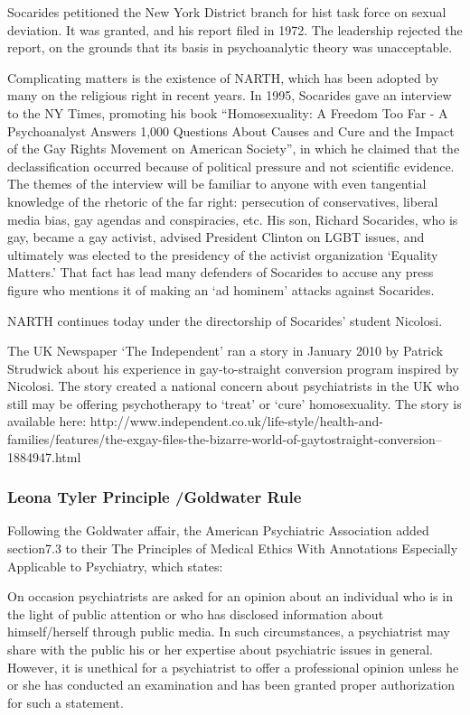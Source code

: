 Socarides petitioned the New York District branch for hist task force on sexual deviation. It was granted, and his report filed in 1972. The leadership rejected the report, on the grounds that its basis in psychoanalytic theory was unacceptable. 

Complicating matters is the existence of NARTH, which has been adopted by many on the religious right in recent years. In 1995, Socarides gave an interview to the NY Times, promoting his book ``Homosexuality: A Freedom Too Far - A Psychoanalyst Answers 1,000 Questions About Causes and Cure and the Impact of the Gay Rights Movement on American Society'', in which he claimed that the declassification occurred because of political pressure and not scientific evidence. The themes of the interview will be familiar to anyone with even tangential knowledge of the rhetoric of the far right: persecution of conservatives, liberal media bias, gay agendas and conspiracies, etc. His son, Richard Socarides, who is gay, became a gay activist, advised President Clinton on LGBT issues, and ultimately was elected to the presidency of the activist organization `Equality Matters.' That fact has lead many defenders of Socarides to accuse any press figure who mentions it of making an `ad hominem' attacks against Socarides. 

NARTH continues today under the directorship of Socarides' student Nicolosi.

The UK Newspaper `The Independent' ran a story in January 2010 by Patrick Strudwick about his experience in gay-to-straight conversion program inspired by Nicolosi. The story created a national concern about psychiatrists in the UK who still may be offering psychotherapy to `treat' or `cure' homosexuality. The story is available here: http:\slash \slash www.independent.co.uk\slash life-style\slash health-and-families\slash features\slash the-exgay-files-the-bizarre-world-of-gaytostraight-conversion--1884947.html

\subsubsection{Leona Tyler Principle \slash  Goldwater Rule}
\label{leonatylerprinciplegoldwaterrule}

Following the Goldwater affair, the American Psychiatric Association added section7.3 to their The Principles of Medical Ethics With Annotations Especially Applicable to Psychiatry, which states:

On occasion psychiatrists are asked for an opinion about an individual who is in the light of public attention or who has disclosed information about himself\slash herself through public media. In such circumstances, a psychiatrist may share with the public his or her expertise about psychiatric issues in general. However, it is unethical for a psychiatrist to offer a professional opinion unless he or she has conducted an examination and has been granted proper authorization for such a statement.

